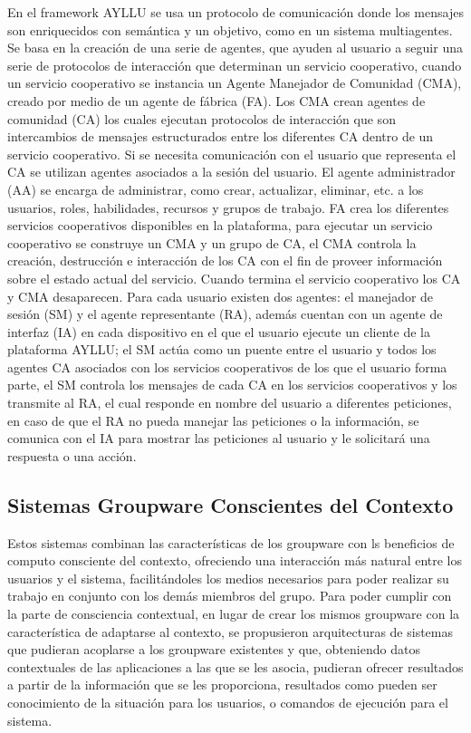En el framework AYLLU \cite{arias2012platform} se usa un protocolo de comunicaci\'on donde los mensajes son enriquecidos con sem\'antica y un objetivo, como en un sistema multiagentes. Se basa en la creaci\'on de una serie de agentes, que ayuden al usuario a seguir una serie de protocolos de interacci\'on que determinan un servicio cooperativo, cuando un servicio cooperativo se instancia un Agente Manejador de Comunidad (CMA), creado por medio de un agente de f\'abrica (FA). Los CMA crean agentes de comunidad (CA) los cuales ejecutan protocolos de interacci\'on que son intercambios de mensajes estructurados entre los diferentes CA dentro de un servicio cooperativo. Si se necesita comunicaci\'on con el usuario que representa el CA  se utilizan agentes asociados a la sesi\'on del usuario. El agente administrador (AA) se encarga de administrar, como crear, actualizar, eliminar, etc. a los usuarios, roles, habilidades, recursos y grupos de trabajo. FA crea los diferentes servicios cooperativos disponibles en la plataforma, para ejecutar un servicio cooperativo se construye un CMA y un grupo de CA, el CMA controla la creaci\'on, destrucci\'on e interacci\'on  de los CA con el fin de proveer informaci\'on sobre el estado actual del servicio. Cuando termina el servicio cooperativo los CA y CMA desaparecen. Para cada usuario existen dos agentes: el manejador de sesi\'on (SM) y el agente representante (RA), adem\'as cuentan con un agente de interfaz (IA) en cada dispositivo en el que el usuario ejecute un cliente de la plataforma AYLLU; el SM act\'ua como un puente entre el usuario y todos los agentes CA asociados con los servicios cooperativos de los que el usuario forma parte, el SM controla los mensajes de cada CA en los servicios cooperativos y los transmite al RA, el cual responde en nombre del usuario a diferentes peticiones, en caso de que el RA no pueda manejar las peticiones o la informaci\'on, se comunica con el IA para mostrar las peticiones al usuario y le solicitar\'a una respuesta o una acci\'on.

\subsection{Sistemas Groupware Conscientes del Contexto}

Estos sistemas combinan las caracter\'isticas de los groupware con ls beneficios de computo consciente del contexto, ofreciendo una interacci\'on más natural entre los usuarios y el sistema, facilit\'andoles los medios necesarios para poder realizar su trabajo en conjunto con los dem\'as miembros del grupo. Para poder cumplir con la parte de consciencia contextual, en lugar de crear los mismos groupware con la caracter\'istica de adaptarse al contexto, se propusieron arquitecturas de sistemas que pudieran acoplarse a los groupware existentes y que, obteniendo datos contextuales de las aplicaciones a las que se les asocia, pudieran ofrecer resultados a partir de la informaci\'on que se les proporciona, resultados como pueden ser conocimiento de la situaci\'on para los usuarios, o comandos de ejecuci\'on para el sistema.

